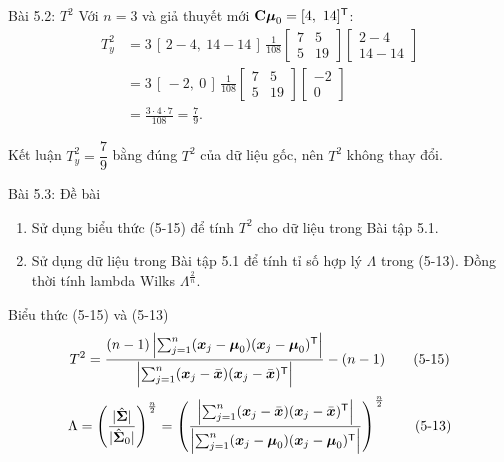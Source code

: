  
\begin{frame}{Bài 5.2: \(T^2\)}
  \vspace{0.05cm}
  Với \(n=3\) và giả thuyết mới \(\mat{C}\vect{\mu}_0=[4,\ 14]\trans\):
  \[
  \begin{aligned}
    T^2_y &= 3\,[\,2-4,\ 14-14\,]\,\frac{1}{108}
      \begin{bmatrix}7&5\\5&19\end{bmatrix}
      \begin{bmatrix}2-4\\14-14\end{bmatrix}\\
    &= 3\,[\,-2,\ 0\,]\,\frac{1}{108}
      \begin{bmatrix}7&5\\5&19\end{bmatrix}
      \begin{bmatrix}-2\\0\end{bmatrix}\\
      &=\frac{3\cdot 4\cdot 7}{108} =\frac{7}{9}.
  \end{aligned}
  \]
 
  \begin{alertblock}{Kết luận}
    \vspace{0.1cm}
    \(T^2_y=\dfrac{7}{9}\) bằng đúng \(T^2\) của dữ liệu gốc, nên \(T^2\) không thay đổi. 
  \end{alertblock}
\end{frame}
 
\begin{frame}{Bài 5.3: Đề bài}
  \vspace{0.5cm}
    \begin{enumerate}
      \item[(a)] Sử dụng biểu thức (5-15) để tính \(T^2\) cho dữ liệu trong Bài tập 5.1.
      \item[(b)] Sử dụng dữ liệu trong Bài tập 5.1 để tính tỉ số hợp lý \(\Lambda\) trong (5-13). Đồng thời tính lambda Wilks \(\Lambda^{\frac{2}{n}}\).
    \end{enumerate}
  \vspace{-0.1cm}
  \footnotesize
  \begin{block}{Biểu thức (5-15) và (5-13)}
    \vspace{-0.2cm}
    \begin{equation*}
      T^2=\frac{(n-1)\left|\sum_{j=1}^n(\boldsymbol{x}_j-\boldsymbol{\mu}_0)(\boldsymbol{x}_j-\boldsymbol{\mu}_0)^{\mathsf T}\right|}
      {\left|\sum_{j=1}^n(\boldsymbol{x}_j-\bar{\boldsymbol{x}})(\boldsymbol{x}_j-\bar{\boldsymbol{x}})^{\mathsf T}\right|}-(n-1)
    \tag{5-15}
    \end{equation*}
    \begin{equation*}
      \Lambda=\left(\frac{|\hat{\boldsymbol{\Sigma}}|}{|\hat{\boldsymbol{\Sigma}}_0|}\right)^{\frac{n}{2}}
      =\left(\frac{\left|\sum_{j=1}^n(\boldsymbol{x}_j-\bar{\boldsymbol{x}})(\boldsymbol{x}_j-\bar{\boldsymbol{x}})^{\mathsf T}\right|}
      {\left|\sum_{j=1}^n(\boldsymbol{x}_j-\boldsymbol{\mu}_0)(\boldsymbol{x}_j-\boldsymbol{\mu}_0)^{\mathsf T}\right|}\right)^{\frac{n}{2}}
    \tag{5-13}
    \end{equation*}
  \end{block}
\end{frame}
 
